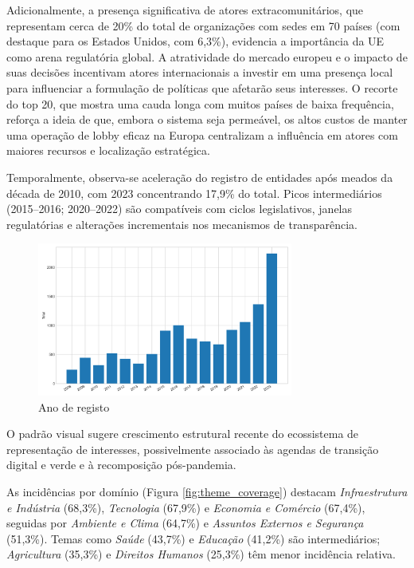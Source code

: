 Adicionalmente, a presença significativa de atores extracomunitários, que representam cerca de 20\% do total de organizações com sedes em 70 países (com destaque para os Estados Unidos, com 6,3\%), evidencia a importância da UE como arena regulatória global. A atratividade do mercado europeu e o impacto de suas decisões incentivam atores internacionais a investir em uma presença local para influenciar a formulação de políticas que afetarão seus interesses. O recorte do top 20, que mostra uma cauda longa com muitos países de baixa frequência, reforça a ideia de que, embora o sistema seja permeável, os altos custos de manter uma operação de lobby eficaz na Europa centralizam a influência em atores com maiores recursos e localização estratégica.

Temporalmente, observa-se aceleração do registro de entidades após meados da década de 2010, com 2023 concentrando 17,9\% do total. Picos intermediários (2015--2016; 2020--2022) são compatíveis com ciclos legislativos, janelas regulatórias e alterações incrementais nos mecanismos de transparência.

\begin{figure}[!htbp]
\centering
\includegraphics[width=0.75\textwidth]{figures/year_distribution.png}
\caption{Ano de registo}
\end{figure}

O padrão visual sugere crescimento estrutural recente do ecossistema de representação de interesses, possivelmente associado às agendas de transição digital e verde e à recomposição pós-pandemia.

As incidências por domínio (Figura \ref{fig:theme_coverage}) destacam \textit{Infraestrutura e Indústria} (68,3\%), \textit{Tecnologia} (67,9\%) e \textit{Economia e Comércio} (67,4\%), seguidas por \textit{Ambiente e Clima} (64,7\%) e \textit{Assuntos Externos e Segurança} (51,3\%). Temas como \textit{Saúde} (43,7\%) e \textit{Educação} (41,2\%) são intermediários; \textit{Agricultura} (35,3\%) e \textit{Direitos Humanos} (25,3\%) têm menor incidência relativa.

